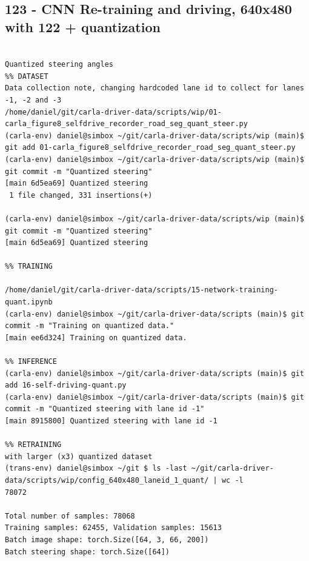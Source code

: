 \subsection{123 - CNN Re-training and driving, 640x480 with 122 + quantization}
\label{app_res:123}

\begin{verbatim}

Quantized steering angles
%% DATASET
Data collection note, changing hardcoded lane id to collect for lanes -1, -2 and -3
/home/daniel/git/carla-driver-data/scripts/wip/01-carla_figure8_selfdrive_recorder_road_seg_quant_steer.py
(carla-env) daniel@simbox ~/git/carla-driver-data/scripts/wip (main)$ git add 01-carla_figure8_selfdrive_recorder_road_seg_quant_steer.py
(carla-env) daniel@simbox ~/git/carla-driver-data/scripts/wip (main)$ git commit -m "Quantized steering"
[main 6d5ea69] Quantized steering
 1 file changed, 331 insertions(+)
 
(carla-env) daniel@simbox ~/git/carla-driver-data/scripts/wip (main)$ git commit -m "Quantized steering"
[main 6d5ea69] Quantized steering

%% TRAINING

/home/daniel/git/carla-driver-data/scripts/15-network-training-quant.ipynb
(carla-env) daniel@simbox ~/git/carla-driver-data/scripts (main)$ git commit -m "Training on quantized data."
[main ee6d324] Training on quantized data.

%% INFERENCE
(carla-env) daniel@simbox ~/git/carla-driver-data/scripts (main)$ git add 16-self-driving-quant.py
(carla-env) daniel@simbox ~/git/carla-driver-data/scripts (main)$ git commit -m "Quantized steering with lane id -1"
[main 8915800] Quantized steering with lane id -1

%% RETRAINING
with larger (x3) quantized dataset
(trans-env) daniel@simbox ~/git $ ls -last ~/git/carla-driver-data/scripts/wip/config_640x480_laneid_1_quant/ | wc -l
78072

Total number of samples: 78068
Training samples: 62455, Validation samples: 15613
Batch image shape: torch.Size([64, 3, 66, 200])
Batch steering shape: torch.Size([64])

\end{verbatim}

